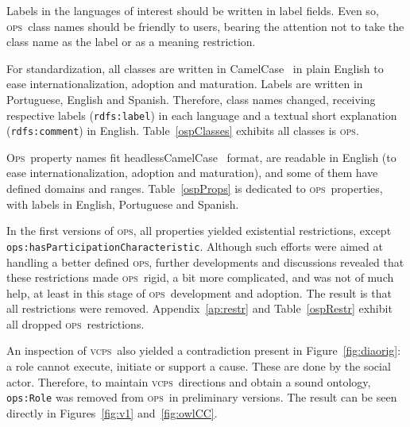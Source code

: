 \documentclass[10pt,letterpaper]{article}
\newcommand{\ops}{\textsc{ops}}
\newcommand{\opsi}{O\textsc{ps}}
\newcommand{\vcps}{\textsc{vcps}}
\begin{document}
Labels in the languages of interest should be written in label fields. Even so, \ops\ class names should be friendly to users, bearing the attention not to take the class name as the label or as a meaning restriction.

For standardization, all classes are written in CamelCase~\cite{cc} in plain English to ease internationalization, adoption and maturation. Labels are written in Portuguese, English and Spanish. Therefore, class names changed, receiving respective labels (\texttt{rdfs:label}) in each language and a textual short explanation (\texttt{rdfs:comment}) in English. 
Table~\ref{ospClasses} exhibits all classes is \ops.

\opsi\ property names fit headlessCamelCase~\cite{cc} format, are readable in English (to ease internationalization, adoption and maturation), and some of them have defined domains and ranges. Table~\ref{ospProps} is dedicated to \ops\ properties, with labels in English, Portuguese and Spanish.

In the first versions of \ops, all properties yielded existential restrictions, except {\tt ops:hasParticipationCharacteristic}. Although such efforts were aimed at handling a better defined \ops, further developments and discussions revealed that these restrictions made \ops\ rigid, a bit more complicated, and was not of much help, at least in this stage of \ops\ development and adoption. The result is that all restrictions were removed. Appendix~\ref{ap:restr} and Table~\ref{ospRestr} exhibit all dropped \ops\ restrictions.

An inspection of \vcps\ also yielded a contradiction present in Figure~\ref{fig:diaorig}: a role cannot execute, initiate or support a cause. These are done by the social actor. Therefore, to maintain \vcps\ directions and obtain a sound ontology, {\tt ops:Role} was removed from \ops\ in preliminary versions. The result can be seen directly in Figures~\ref{fig:v1} and~\ref{fig:owlCC}.
\end{document}
